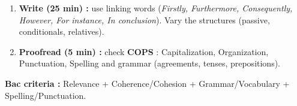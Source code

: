 \documentclass[11pt]{article}
\newcommand{\cle}[1]{{\popxbold\color{popdark}#1}}
\begin{document}
\begin{methode}
\begin{enumerate}
\begin{itemize}
\begin{itemize}
        \end{itemize}
        \item \textbf{Conclusion :} summary $\rightarrow$ restated thesis $\rightarrow$ \cle{opening} (future question, proverb, final appeal).
    \end{itemize}
    \item \textbf{Write (25 min) :} use \cle{linking words} (\textit{Firstly, Furthermore, Consequently, However, For instance, In conclusion}). Vary the structures (passive, conditionals, relatives).
    \item \textbf{Proofread (5 min) :} check \textbf{COPS} : \cle{C}apitalization, \cle{O}rganization, \cle{P}unctuation, \cle{S}pelling and grammar (agreements, tenses, prepositions).
\end{enumerate}
\textbf{Bac criteria :} Relevance + Coherence/Cohesion + Grammar/Vocabulary + Spelling/Punctuation.
\end{methode}
\end{document}
